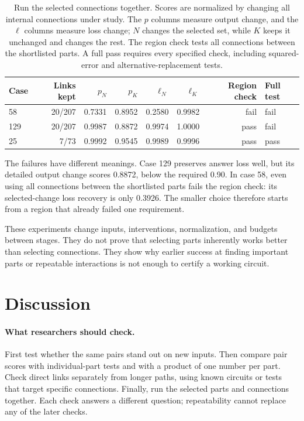 \documentclass[11pt]{article}
\begin{document}
\begin{table}[t]
\centering\small
\caption{Run the selected connections together. Scores are normalized by
changing all internal connections under study. The $p$ columns measure output
change, and the $\ell$ columns measure loss change; $N$ changes the selected
set, while $K$ keeps it unchanged and changes the rest. The region check tests
all connections between the shortlisted parts. A full pass requires every
specified check, including squared-error and alternative-replacement tests.}
\label{tab:sets}
\begin{tabular}{lrrrrrrl}
\toprule
Case & Links kept & $p_N$ & $p_K$ & $\ell_N$ & $\ell_K$ & Region check & Full test\\
\midrule
58  & 20/207 & 0.7331 & 0.8952 & 0.2580 & 0.9982 & fail & fail\\
129 & 20/207 & 0.9987 & 0.8872 & 0.9974 & 1.0000 & pass & fail\\
25  & 7/73   & 0.9992 & 0.9545 & 0.9989 & 0.9996 & pass & pass\\
\bottomrule
\end{tabular}
\end{table}

The failures have different meanings. Case 129 preserves answer loss well,
but its detailed output change scores 0.8872, below the required 0.90. In case
58, even using all connections between the shortlisted parts fails the region
check: its selected-change loss recovery is only 0.3926. The smaller choice
therefore starts from a region that already failed one requirement.

These experiments change inputs, interventions, normalization, and budgets
between stages. They do not prove that selecting parts inherently works better
than selecting connections. They show why earlier success at finding important
parts or repeatable interactions is not enough to certify a working circuit.

\section{Discussion}
\paragraph{What researchers should check.}
First test whether the same pairs stand out on new inputs. Then compare pair
scores with individual-part tests and with a product of one number per part.
Check direct links separately from longer paths, using known circuits or tests
that target specific connections. Finally, run the selected parts and
connections together. Each check answers a different question; repeatability
cannot replace any of the later checks.
\end{document}
